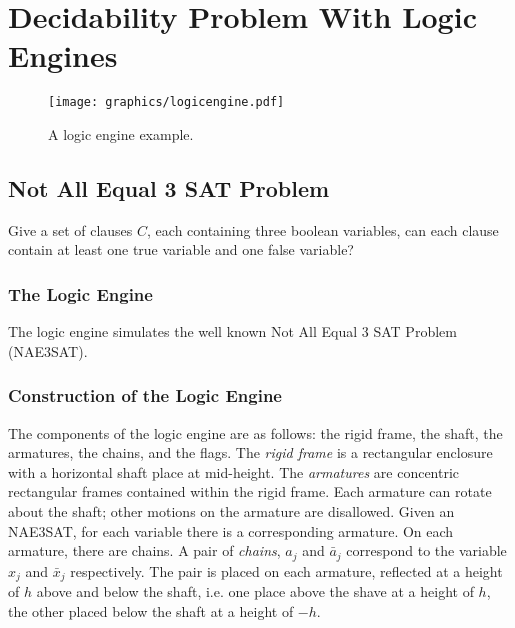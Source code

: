 \chapter{Decidability Problem With Logic Engines}
\begin{figure}[!htbp]
\begin{center}
\texttt{[image: graphics/logicengine.pdf]}
\caption{A logic engine example.}\label{fig:logicengine-1}
\end{center}
\end{figure}
\section{Not All Equal 3 SAT Problem}
\begin{prob}\label{prob:Satisfiability-2}%
Give a set of clauses $C$, each containing three boolean variables, can each clause contain at
least one true variable and one false variable?
\end{prob}
\subsection{The Logic Engine}
The logic engine simulates the well known Not All Equal 3 SAT Problem (NAE3SAT).
\subsection{Construction of the Logic Engine}
The components of the logic engine are as follows: the rigid frame, the shaft, the armatures,
the chains, and the flags.  The \textit{rigid frame} is a rectangular enclosure with a horizontal
shaft place at mid-height.  The \textit{armatures} are concentric rectangular frames contained
within the rigid frame.  Each armature can rotate about the shaft; other motions on the armature
are disallowed.  Given an NAE3SAT, for each variable there is a corresponding armature. On each
armature, there are chains.  A pair of \textit{chains}, $a_j$ and $\bar{a}_j$ correspond to the
variable $x_j$ and $\bar{x}_j$ respectively.  The pair is placed on each armature, reflected at a
height of $h$ above and below the shaft, i.e. one place above the shave at a height of $h$, the
other placed below the shaft at a height of $-h$.

